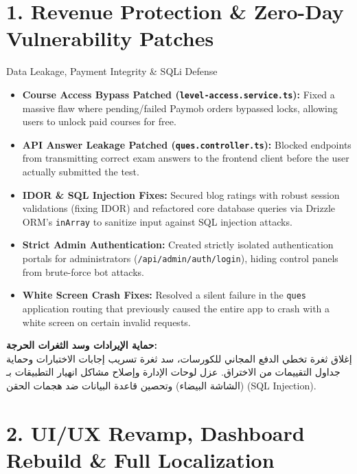 \documentclass[11pt,a4paper]{article}
\begin{document}
\tableofcontents\newpage

\section{1. Revenue Protection \& Zero-Day Vulnerability Patches}

\begin{topicbox}{Data Leakage, Payment Integrity \& SQLi Defense}
\begin{itemize}[leftmargin=*]
\item \textbf{Course Access Bypass Patched (\texttt{level-access.service.ts}):} Fixed a massive flaw where pending/failed Paymob orders bypassed locks, allowing users to unlock paid courses for free. 
\item \textbf{API Answer Leakage Patched (\texttt{ques.controller.ts}):} Blocked endpoints from transmitting correct exam answers to the frontend client before the user actually submitted the test.
\item \textbf{IDOR \& SQL Injection Fixes:} Secured blog ratings with robust session validations (fixing IDOR) and refactored core database queries via Drizzle ORM's \texttt{inArray} to sanitize input against SQL injection attacks.
\item \textbf{Strict Admin Authentication:} Created strictly isolated authentication portals for administrators (\texttt{/api/admin/auth/login}), hiding control panels from brute-force bot attacks.
\item \textbf{White Screen Crash Fixes:} Resolved a silent failure in the \texttt{ques} application routing that previously caused the entire app to crash with a white screen on certain invalid requests.
\end{itemize}
\end{topicbox}
\begin{arabicbox}
\textbf{\textarabic{حماية الإيرادات وسد الثغرات الحرجة:}}\\
\textarabic{إغلاق ثغرة تخطي الدفع المجاني للكورسات، سد ثغرة تسريب إجابات الاختبارات وحماية جداول التقييمات من الاختراق. عزل لوحات الإدارة وإصلاح مشاكل انهيار التطبيقات بـ (الشاشة البيضاء) وتحصين قاعدة البيانات ضد هجمات الحقن} (\textenglish{SQL Injection})\textarabic{.}
\end{arabicbox}

\section{2. UI/UX Revamp, Dashboard Rebuild \& Full Localization}
\end{document}
